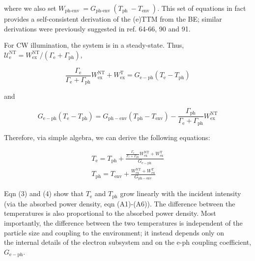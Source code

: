 \documentclass[10pt]{article}
\begin{document}
where we also set $W_{\text {ph-env }}=G_{\text {ph-env }}\left(T_{\text {ph }}-T_{\text {env }}\right)$. This set of equations in fact provides a self-consistent derivation of the (e)TTM from the BE; similar derivations were previously suggested in ref. 64-66, 90 and 91.

For CW illumination, the system is in a steady-state. Thus, $\mathcal{U}_{\mathrm{e}}^{\mathrm{NT}}=W_{\mathrm{ex}}^{\mathrm{NT}} /\left(\Gamma_{\mathrm{e}}+\Gamma_{\mathrm{ph}}\right)$,

$$
\frac{\Gamma_{\mathrm{e}}}{\Gamma_{\mathrm{e}}+\Gamma_{\mathrm{ph}}} W_{\mathrm{ex}}^{\mathrm{NT}}+W_{\mathrm{ex}}^{\mathrm{T}}=G_{\mathrm{e}-\mathrm{ph}}\left(T_{\mathrm{e}}-T_{\mathrm{ph}}\right)
$$

and

$$
G_{\mathrm{e}-\mathrm{ph}}\left(T_{\mathrm{e}}-T_{\mathrm{ph}}\right)=G_{\mathrm{ph}-\mathrm{env}}\left(T_{\mathrm{ph}}-T_{\mathrm{env}}\right)-\frac{\Gamma_{\mathrm{ph}}}{\Gamma_{\mathrm{e}}+\Gamma_{\mathrm{ph}}} W_{\mathrm{ex}}^{\mathrm{NT}}
$$

Therefore, via simple algebra, we can derive the following equations:


\begin{gather*}
T_{\mathrm{e}}=T_{\mathrm{ph}}+\frac{\frac{\Gamma_{\mathrm{e}}}{\Gamma_{\mathrm{e}}+\Gamma_{\mathrm{ph}}} W_{\mathrm{ex}}^{\mathrm{NT}}+W_{\mathrm{ex}}^{\mathrm{T}}}{G_{\mathrm{e}-\mathrm{ph}}}  \tag{3}\\
T_{\mathrm{ph}}=T_{\mathrm{env}}+\frac{W_{\mathrm{ex}}^{\mathrm{NT}}+W_{\mathrm{ex}}^{\mathrm{T}}}{G_{\mathrm{ph}-\mathrm{env}}} \tag{4}
\end{gather*}


Eqn (3) and (4) show that $T_{\mathrm{e}}$ and $T_{\mathrm{ph}}$ grow linearly with the incident intensity (via the absorbed power density, eqn (A1)-(A6)). The difference between the temperatures is also proportional to the absorbed power density. Most importantly, the difference between the two temperatures is independent of the particle size and coupling to the environment; it instead depends only on\\
the internal details of the electron subsystem and on the e-ph coupling coefficient, $G_{\mathrm{e}-\mathrm{ph}}$.
\end{document}
